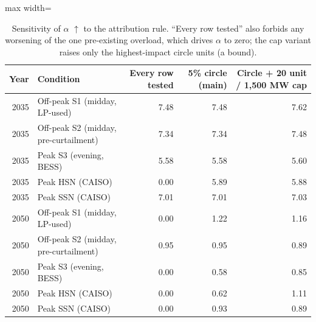 \begin{table}[!htbp]
\centering
\scriptsize
\caption{Sensitivity of $\alpha$ $\uparrow$ to the attribution rule. \enquote{Every row tested} also forbids any worsening of the one pre-existing overload, which drives $\alpha$ to zero; the cap variant raises only the highest-impact circle units (a bound).}
\label{tab:rule}
\begin{adjustbox}{max width=\linewidth}
\begin{tabular}{rlrrr}
\toprule
Year & Condition & Every row tested & 5\% circle (main) & Circle + 20 unit / 1,500 MW cap \\
\midrule
2035 & Off-peak S1 (midday, LP-used) & 7.48 & 7.48 & 7.62 \\
2035 & Off-peak S2 (midday, pre-curtailment) & 7.34 & 7.34 & 7.48 \\
2035 & Peak S3 (evening, BESS) & 5.58 & 5.58 & 5.60 \\
2035 & Peak HSN (CAISO) & 0.00 & 5.89 & 5.88 \\
2035 & Peak SSN (CAISO) & 7.01 & 7.01 & 7.03 \\
2050 & Off-peak S1 (midday, LP-used) & 0.00 & 1.22 & 1.16 \\
2050 & Off-peak S2 (midday, pre-curtailment) & 0.95 & 0.95 & 0.89 \\
2050 & Peak S3 (evening, BESS) & 0.00 & 0.58 & 0.85 \\
2050 & Peak HSN (CAISO) & 0.00 & 0.62 & 1.11 \\
2050 & Peak SSN (CAISO) & 0.00 & 0.93 & 0.89 \\
\bottomrule
\end{tabular}
\end{adjustbox}
\end{table}
